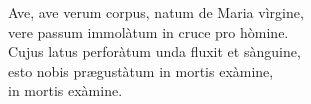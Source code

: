 
Ave, ave verum corpus, natum de Maria vìrgine,\\
vere passum immolàtum in cruce pro hòmine.\\
Cujus latus perforàtum unda fluxit et sànguine,\\
esto nobis pr\ae gustàtum in mortis exàmine,\\
in mortis exàmine.